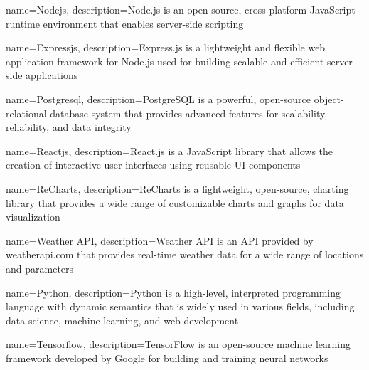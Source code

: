 \usepackage{glossaries}
\makenoidxglossaries

\renewcommand{\glstextformat}[1]{\textit{#1}}



{
    name=Nodejs,
    description={Node.js is an open-source, cross-platform JavaScript runtime environment that enables server-side scripting}
}

{
    name=Expressjs,
    description={Express.js is a lightweight and flexible web application framework for Node.js used for building scalable and efficient server-side applications~\parencite{expressjs}}
}

{
    name=Postgresql,
    description={PostgreSQL is a powerful, open-source object-relational database system that provides advanced features for scalability, reliability, and data integrity}
}

{
    name=Reactjs,
    description={React.js is a JavaScript library that allows the creation of interactive user interfaces using reusable UI components}
}

{
    name=ReCharts,
    description={ReCharts is a lightweight, open-source, charting library that provides a wide range of customizable charts and graphs for data visualization}
}

{
    name=Weather API,
    description={Weather API is an API provided by weatherapi.com that provides real-time weather data for a wide range of locations and parameters}
}

{
    name=Python,
    description={Python is a high-level, interpreted programming language with dynamic semantics that is widely used in various fields, including data science, machine learning, and web development}
}

{
    name=Tensorflow,
    description={TensorFlow is an open-source machine learning framework developed by Google for building and training neural networks}
}


